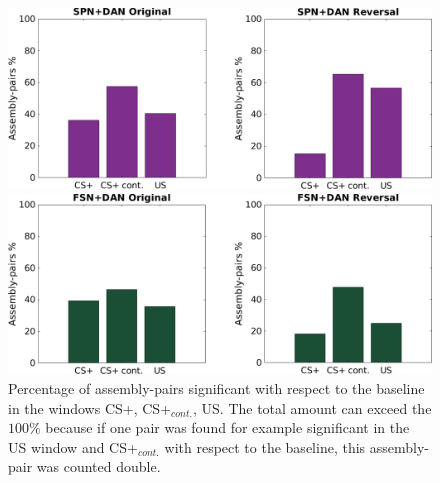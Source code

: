  \begin{figure}
    \centering
    \includegraphics[scale=0.36]{figures/SPN_DANHisto.pdf}
    
    \vspace{1cm}
    
    \includegraphics[scale=0.36]{figures/FSN_DANHisto.pdf}
\caption{Percentage of assembly-pairs significant with respect to the baseline in the windows CS+, CS+$_{cont.}$, US. The total amount can exceed the $100\%$ because if one pair was found for example significant in the US window and CS+$_{cont.}$ with respect to the baseline, this assembly-pair was counted double.}
    \label{fig:FriedHistoDAN}
\end{figure}
